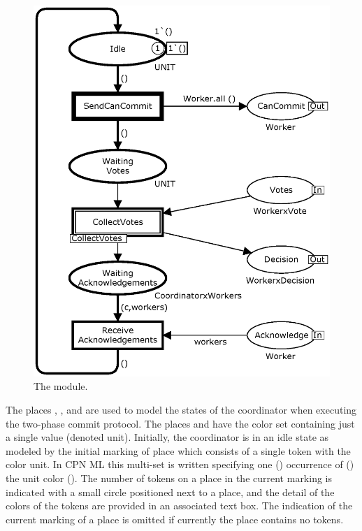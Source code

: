 \begin{figure}[]
\centering
\includegraphics[scale=.45]{figures/Coordinator.eps}
\caption{The  module.}
\label{fig:coordinator}
\end{figure}



The places , , and
 are used to model the states of the
coordinator when executing the two-phase commit protocol. The places
 and  have the color set
 containing just a single value \smlcode{()} (denoted
unit). Initially, the coordinator is in an idle state as modeled by
the initial marking of place  which consists of a single
token with the color unit. In CPN ML this multi-set is written
 specifying one () occurrence of
() the unit color (\smlcode{()}).  The number of tokens on
a place in the current marking is indicated with a small circle
positioned next to a place, and the detail of the colors of the tokens
are provided in an associated text box. The indication of the current
marking of a place is omitted if currently the place contains no
tokens.

